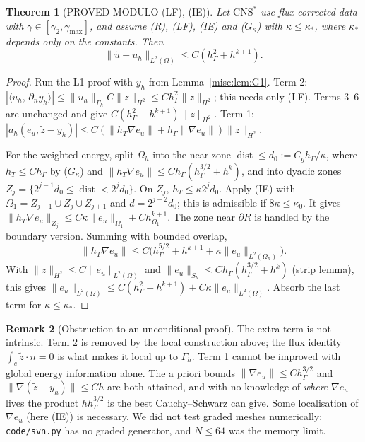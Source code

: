 \documentclass[11pt,reqno]{amsart}
\theoremstyle{plain}
\newtheorem{theorem}{Theorem}[section]
\theoremstyle{definition}
\newtheorem{remark}[theorem]{Remark}
\newcommand{\hG}{h_\Gamma}
\newcommand{\Gh}{\Gamma_h}
\newcommand{\Oh}{\Omega_h}
\newcommand{\dn}{\partial_n}
\newcommand{\ut}{\tilde u}
\newcommand{\ip}[2]{\langle #1,\, #2\rangle}
\newcommand{\norm}[1]{\lVert #1\rVert}
\newcommand{\CNS}{\mathrm{CNS}^\ast}
\DeclareMathOperator{\dist}{dist}
\begin{document}
\begin{theorem}[PROVED MODULO (LF), (IE)]\label{misc:thm:G}
Let $\CNS$ use flux-corrected data with $\gamma\in[\gamma_2,\gamma_{\max}]$, and assume (R), (LF), (IE) and ($G_\kappa$) with $\kappa\le\kappa_\ast$, where $\kappa_\ast$ depends only on the constants. Then
\[
\norm{\ut-u_h}_{L^2(\Omega)}\le C(\hG^2+h^{k+1}).
\]
\end{theorem}

\begin{proof}
Run the L1 proof with $y_h$ from Lemma~\ref{misc:lem:G1}. Term 2: $|\ip{u_h}{\dn y_h}|\le\norm{u_h}_{\Gh}C\norm z_{H^2}\le C\hG^2\norm z_{H^2}$; this needs only (LF). Terms 3--6 are unchanged and give $C(\hG^2+h^{k+1})\norm z_{H^2}$. Term 1: $|a_h(e_u,\tilde z-y_h)|\le C(\norm{h_T\nabla e_u}+\hG\norm{\nabla e_u})\norm z_{H^2}$.

For the weighted energy, split $\Oh$ into the near zone $\dist\le d_0:=C_g\hG/\kappa$, where $h_T\le C\hG$ by ($G_\kappa$) and $\norm{h_T\nabla e_u}\le C\hG(\hG^{3/2}+h^k)$, and into dyadic zones $Z_j=\{2^{j-1}d_0\le\dist<2^jd_0\}$. On $Z_j$, $h_T\le\kappa2^jd_0$. Apply (IE) with $\Omega_1=Z_{j-1}\cup Z_j\cup Z_{j+1}$ and $d=2^{j-2}d_0$; this is admissible if $8\kappa\le\kappa_0$. It gives $\norm{h_T\nabla e_u}_{Z_j}\le C\kappa\norm{e_u}_{\Omega_1}+Ch^{k+1}_{\Omega_1}$. The zone near $\partial R$ is handled by the boundary version. Summing with bounded overlap,
\[
\norm{h_T\nabla e_u}\le C\bigl(\hG^{5/2}+h^{k+1}+\kappa\norm{e_u}_{L^2(\Oh)}\bigr).
\]
With $\norm z_{H^2}\le C\norm{e_u}_{L^2(\Omega)}$ and $\norm{e_u}_{S_h}\le C\hG(\hG^{3/2}+h^k)$ (strip lemma), this gives $\norm{e_u}_{L^2(\Omega)}\le C(\hG^2+h^{k+1})+C\kappa\norm{e_u}_{L^2(\Omega)}$. Absorb the last term for $\kappa\le\kappa_\ast$.
\end{proof}

\begin{remark}[Obstruction to an unconditional proof]
The extra term is not intrinsic. Term 2 is removed by the local construction above; the flux identity $\int_e\tilde z\cdot n=0$ is what makes it local up to $\Gh$. Term 1 cannot be improved with global energy information alone. The a priori bounds $\norm{\nabla e_u}\le C\hG^{3/2}$ and $\norm{\nabla(\tilde z-y_h)}\le Ch$ are both attained, and with no knowledge of \emph{where} $\nabla e_u$ lives the product $h\hG^{3/2}$ is the best Cauchy--Schwarz can give. Some localisation of $\nabla e_u$ (here (IE)) is necessary. We did not test graded meshes numerically: \texttt{code/svn.py} has no graded generator, and $N\le64$ was the memory limit.
\end{remark}
\end{document}
